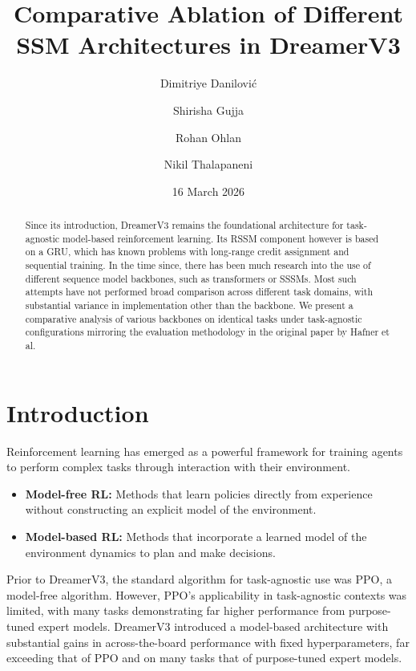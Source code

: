 \documentclass{article}
\title{Comparative Ablation of Different SSM Architectures in DreamerV3}
\author{Dimitriye Danilović \and Shirisha Gujja \and Rohan Ohlan \and Nikil Thalapaneni}
\date{16 March 2026}
\begin{document}
\maketitle

\begin{abstract}
Since its introduction, DreamerV3\cite{dreamer} remains the foundational architecture for task-agnostic model-based reinforcement learning. Its RSSM component however is based on a GRU, which has known problems with long-range credit assignment and sequential training. In the time since, there has been much research into the use of different sequence model backbones, such as transformers or SSSMs. Most such attempts have not performed broad comparison across different task domains, with substantial variance in implementation other than the backbone. We present a comparative analysis of various backbones on identical tasks under task-agnostic configurations mirroring the evaluation methodology in the original paper by Hafner et al.
\end{abstract}

\section{Introduction}
Reinforcement learning has emerged as a powerful framework for training agents to perform complex tasks through interaction with their environment. 
\begin{itemize}
    \item \textbf{Model-free RL:} Methods that learn policies directly from experience without constructing an explicit model of the environment.
    \item \textbf{Model-based RL:} Methods that incorporate a learned model of the environment dynamics to plan and make decisions.
\end{itemize}

Prior to DreamerV3, the standard algorithm\cite{dreamer} for task-agnostic use was PPO\cite{ppo}, a model-free algorithm. However, PPO's applicability in task-agnostic contexts was limited, with many tasks demonstrating far higher performance from purpose-tuned expert models\cite{dreamer}. DreamerV3 introduced a model-based architecture with substantial gains in across-the-board performance with fixed hyperparameters, far exceeding that of PPO and on many tasks that of purpose-tuned expert models.
\end{document}
